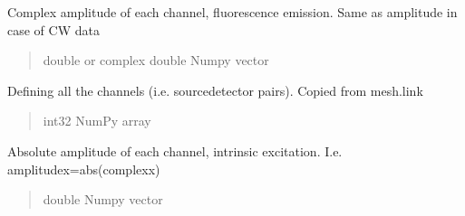 \documentclass[letterpaper,10pt,english]{sphinxmanual}
\begin{document}
\begin{fulllineitems}
\begin{fulllineitems}
\begin{quote}
\begin{description}
\end{description}\end{quote}

\end{fulllineitems}


\begin{fulllineitems}
\label{\detokenize{_autosummary/nirfasterff.base.data.FLdata:nirfasterff.base.data.FLdata.complexfl}}
\pysigstartsignatures
{}
\pysigstopsignatures
\sphinxAtStartPar
Complex amplitude of each channel, fluorescence emission. Same as amplitude in case of CW data
\begin{quote}\begin{description}
\sphinxAtStartPar
double or complex double Numpy vector

\end{description}\end{quote}

\end{fulllineitems}


\begin{fulllineitems}
\label{\detokenize{_autosummary/nirfasterff.base.data.FLdata:nirfasterff.base.data.FLdata.link}}
\pysigstartsignatures
{}
\pysigstopsignatures
\sphinxAtStartPar
Defining all the channels (i.e. source\sphinxhyphen{}detector pairs). Copied from mesh.link
\begin{quote}\begin{description}
\sphinxAtStartPar
int32 NumPy array

\end{description}\end{quote}

\end{fulllineitems}


\begin{fulllineitems}
\label{\detokenize{_autosummary/nirfasterff.base.data.FLdata:nirfasterff.base.data.FLdata.amplitudex}}
\pysigstartsignatures
{}
\pysigstopsignatures
\sphinxAtStartPar
Absolute amplitude of each channel, intrinsic excitation. I.e. amplitudex=abs(complexx)
\begin{quote}\begin{description}
\sphinxAtStartPar
double Numpy vector


\end{description}
\end{quote}
\end{fulllineitems}
\end{fulllineitems}
\end{document}
